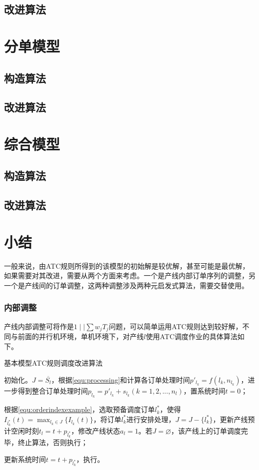 \subsection{改进算法}
\section{分单模型}
\subsection{构造算法}

\subsection{改进算法}
\section{综合模型}
\subsection{构造算法}

\subsection{改进算法}

\section{小结}


一般来说，由ATC规则所得到的该模型的初始解是较优解，甚至可能是最优解，如果需要对其改进，需要从两个方面来考虑。一个是产线内部订单序列的调整，另一个是产线间的订单调整，这两种调整涉及两种元启发式算法，需要交替使用。
\subsubsection{内部调整}
产线内部调整可将作是$1\mid\mid \sum w_jT_j$问题，可以简单运用ATC规则达到较好解，不同与前面的并行机环境，单机环境下，对产线$l$使用ATC调度作业的具体算法如下。

\begin{algori}
基本模型ATC规则调度改进算法
\begin{asparaenum}
\renewcommand{\labelenumi}{\bf Step\theenumi~}
\item 初始化。$J = \overline{S_l}$，根据\eqref{equ:processing}和计算各订单处理时间$p'_{l_k} = f({l_k}, n_{l_k})$，进一步得到整合订单处理时间$p_{l_k} = p'_{l_k} + s_{l_k}(k = 1,2,...,n_l)$，置系统时间$t = 0$；
\item 根据\eqref{equ:orderindexexample}，选取预备调度订单$l_k^*$，使得$I_{l_k^*}(t) = \displaystyle\max_{l_k\in J}\{I_{l_k}(t)\}$，将订单$l_k^*$进行安排处理，$J = J -\{l_k^*\}$，更新产线预计空闲时刻$t_{l} = t + p_{l_k^*}$，修改产线状态$a_{l} = 1$。若$J = \varnothing$，该产线上的订单调度完毕，终止算法，否则执行；
\item 更新系统时间$t = t + p_{l_k^*}$，执行。
\end{asparaenum}
\end{algori}

